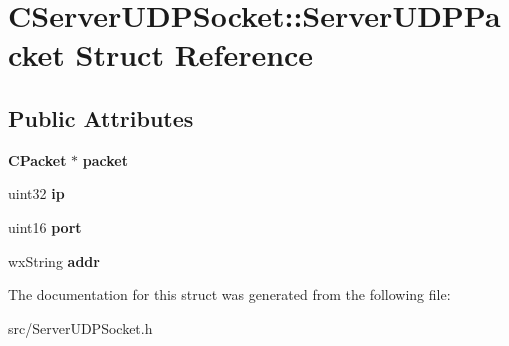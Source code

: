 \section{CServerUDPSocket::ServerUDPPacket Struct Reference}
\label{structCServerUDPSocket_1_1ServerUDPPacket}
\subsection*{Public Attributes}
\begin{DoxyCompactItemize}
\item 
{\bf CPacket} $\ast$ {\bfseries packet}\label{structCServerUDPSocket_1_1ServerUDPPacket_a6753cf987e74d7a2abcf6945bc712371}

\item 
uint32 {\bfseries ip}\label{structCServerUDPSocket_1_1ServerUDPPacket_a99053808232e4c10ff49bb7573f70f63}

\item 
uint16 {\bfseries port}\label{structCServerUDPSocket_1_1ServerUDPPacket_ae3aa69a423e5d47753f26a00819aa1de}

\item 
wxString {\bfseries addr}\label{structCServerUDPSocket_1_1ServerUDPPacket_ac0e0c0d03c3f5edac5f69cda0ede7a05}

\end{DoxyCompactItemize}


The documentation for this struct was generated from the following file:\begin{DoxyCompactItemize}
\item 
src/ServerUDPSocket.h\end{DoxyCompactItemize}
